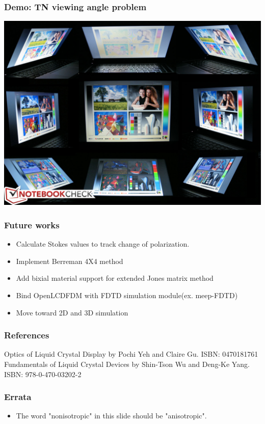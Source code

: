 \documentclass{beamer}
\begin{document}
\begin{frame}
\frametitle{Demo: TN viewing angle problem}
\begin{center}
\includegraphics[scale=0.2]{TN_viewangle.jpg}
\end{center}
\end{frame}
\begin{frame}
\frametitle{Future works}
\begin{itemize}
\item Calculate Stokes values to track change of polarization.
\item Implement Berreman 4X4 method
\item Add bixial material support for extended Jones matrix method
\item Bind OpenLCDFDM with FDTD simulation module(ex. meep-FDTD)
\item Move toward 2D and 3D simulation
\end{itemize}
\end{frame}
\begin{frame}
\frametitle{References}
\begin{thebibliography}{0}
 Optics of Liquid Crystal Display by Pochi Yeh and Claire Gu. ISBN: 0470181761
 Fundamentals of Liquid Crystal Devices by Shin-Tson Wu and Deng-Ke Yang. ISBN: 978-0-470-03202-2
\end{thebibliography}
\end{frame}
\begin{frame}
\frametitle{Errata}
\begin{itemize}
\item The word "nonisotropic" in this slide should be "anisotropic".
\end{itemize}
\end{frame}
\end{document}

